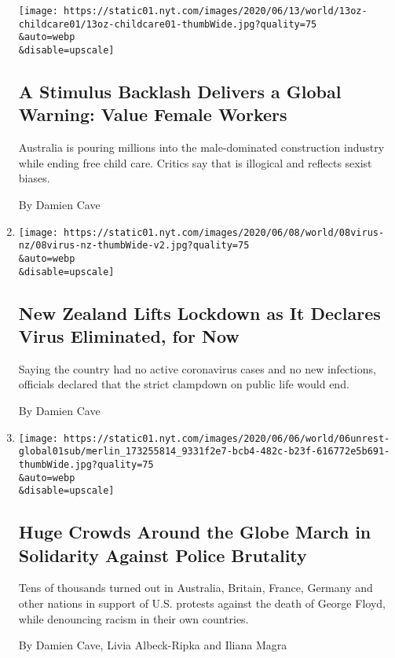 \begin{enumerate}
  \texttt{[image: https://static01.nyt.com/images/2020/06/13/world/13oz-childcare01/13oz-childcare01-thumbWide.jpg?quality=75\\\&auto=webp\\\&disable=upscale]}

  \hypertarget{a-stimulus-backlash-delivers-a-global-warning-value-female-workers}{%
  \subsection{A Stimulus Backlash Delivers a Global Warning: Value
  Female
  Workers}\label{a-stimulus-backlash-delivers-a-global-warning-value-female-workers}}

  Australia is pouring millions into the male-dominated construction
  industry while ending free child care. Critics say that is illogical
  and reflects sexist biases.

  By Damien Cave
\item
  \href{/2020/06/08/world/australia/new-zealand-coronavirus-ardern.html}{}

  \texttt{[image: https://static01.nyt.com/images/2020/06/08/world/08virus-nz/08virus-nz-thumbWide-v2.jpg?quality=75\\\&auto=webp\\\&disable=upscale]}

  \hypertarget{new-zealand-lifts-lockdown-as-it-declares-virus-eliminated-for-now}{%
  \subsection{New Zealand Lifts Lockdown as It Declares Virus
  Eliminated, for
  Now}\label{new-zealand-lifts-lockdown-as-it-declares-virus-eliminated-for-now}}

  Saying the country had no active coronavirus cases and no new
  infections, officials declared that the strict clampdown on public
  life would end.

  By Damien Cave
\item
  \href{/2020/06/06/world/george-floyd-global-protests.html}{}

  \texttt{[image: https://static01.nyt.com/images/2020/06/06/world/06unrest-global01sub/merlin\_173255814\_9331f2e7-bcb4-482c-b23f-616772e5b691-thumbWide.jpg?quality=75\\\&auto=webp\\\&disable=upscale]}

  \hypertarget{huge-crowds-around-the-globe-march-in-solidarity-against-police-brutality}{%
  \subsection{Huge Crowds Around the Globe March in Solidarity Against
  Police
  Brutality}\label{huge-crowds-around-the-globe-march-in-solidarity-against-police-brutality}}

  Tens of thousands turned out in Australia, Britain, France, Germany
  and other nations in support of U.S. protests against the death of
  George Floyd, while denouncing racism in their own countries.

  By Damien Cave, Livia Albeck-Ripka and Iliana Magra
\end{enumerate}

